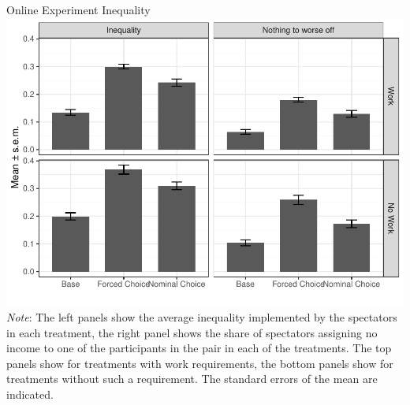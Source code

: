 \documentclass{beamer}
\begin{document}
\begin{frame}{Online Experiment Inequality}
	\includegraphics[height=.70\textheight]{../graphs/mean_ineq_nothing_kantar_wd.pdf}
	{\tiny
	\emph{Note}: The left panels show the average inequality implemented by the spectators in each treatment, the right panel shows the share of spectators assigning no income to one of the participants in the pair in each of the treatments. The top panels show for treatments with work requirements, the bottom panels show for treatments without such a requirement. The standard errors of the mean are indicated.
}
\end{frame}
\end{document}
